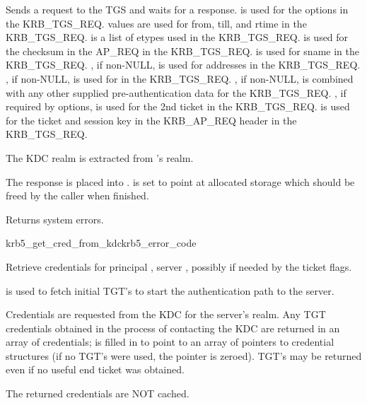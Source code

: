 \internalfunc

Sends a request to the TGS and waits for a response.
 is used for the options in the KRB_TGS_REQ.
 values are used for from, till, and rtime in the
KRB_TGS_REQ.
 is a list of etypes used in the KRB_TGS_REQ.
 is used for the checksum in the AP_REQ in the KRB_TGS_REQ.
 is used for sname in the KRB_TGS_REQ.
, if non-NULL, is used for addresses in the KRB_TGS_REQ.
, if non-NULL, is used for
 in the KRB_TGS_REQ.  
, if non-NULL, is combined with any other supplied
pre-authentication data for the KRB_TGS_REQ.
, if required by options, is used for the 2nd
ticket in the KRB_TGS_REQ.
 is used for the ticket and session key in the KRB_AP_REQ header in the KRB_TGS_REQ.

The KDC realm is extracted from 's realm.

The response is placed into .
 is set to point at allocated storage
which should be freed by the caller when finished.

Returns system errors.

\begin{funcdecl}{krb5_get_cred_from_kdc}{krb5_error_code}{\funcinout}
\funcin
{}
\funcout                        
{}
\end{funcdecl}


Retrieve credentials for principal ,
server , possibly
 if needed by the ticket flags.

 is used to fetch initial TGT's to start the authentication
path to the server.

Credentials are requested from the KDC for the server's realm.  Any
TGT credentials obtained in the process of contacting the KDC are
returned in an array of credentials;  is filled in to
point to an array of pointers to credential structures (if no TGT's were
used, the pointer is zeroed).  TGT's may be returned even if no useful
end ticket was obtained.

The returned credentials are NOT cached.


